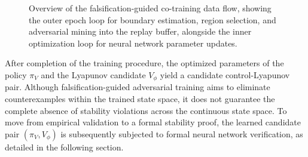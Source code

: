 \begin{figure}[htbp]
    \centering
    
    \caption[Falsification-guided co-training data flow]{
        Overview of the falsification-guided co-training data flow, showing the outer epoch loop for boundary estimation, 
        region selection, and adversarial mining into the replay buffer, alongside the inner optimization loop for 
        neural network parameter updates.}
    \label{fig:train-flow}
\end{figure}

After completion of the training procedure, the optimized parameters of the policy $\pi_V$ and the Lyapunov candidate $V_\phi$ 
yield a candidate control-Lyapunov pair. 
Although falsification-guided adversarial training aims to eliminate counterexamples within the trained state space, 
it does not guarantee the complete absence of stability violations across the continuous state space. 
To move from empirical validation to a formal stability proof, the learned candidate pair $(\pi_V, V_\phi)$ 
is subsequently subjected to formal neural network verification, as detailed in the following section.

